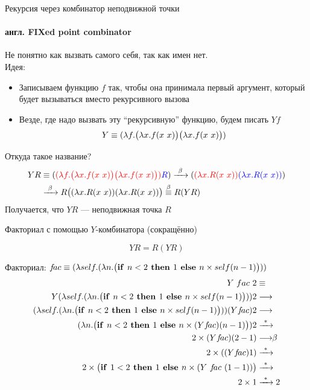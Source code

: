 \newcommand\Y{\ensuremath{Y}}
\begin{frame}{Рекурсия через комбинатор неподвижной точки}
\framesubtitle{англ. FIXed point combinator}
\def\Yimpl{\ensuremath{\lam{f}{\Lam{x}{f(x\ x)}\Lam{x}{f(x\ x)}}}}
Не понятно как вызвать самого себя, так как имен нет.\\

Идея:
\begin{itemize}
  \item Записываем функцию $f$ так, чтобы она принимала первый аргумент, который будет вызываться вместо рекурсивного вызова
  \item Везде, где надо вызвать эту \enquote{рекурсивную} функцию, будем писать $Yf$
\vspace{-0.5em}
  {\Large\begin{align*}
     Y\equiv \Yimpl
  \end{align*}}
\end{itemize}

Откуда такое название?
\begin{align*}
YR &\equiv     \redex{\Yimpl}{R} \arrbeta \redex{\lam{x}{R(x\ x)}}{\lam{x}{R(x\ x)}} \\
&\arrbeta  R\big( \lam{x}{R(x\ x)}\lam{x}{R(x\ x)} \big)   \overset{\beta}{\equiv} R(YR)
\end{align*}
Получается, что $YR$ --- неподвижная точка $R$
\end{frame}


\newcommand{\ite}[3]{\ensuremath{\big{(}\text{\textbf{if }} #1\text{\textbf{ then }}#2\text{\textbf{ else }}#3}\big{)}}
\newcommand{\FIX}{\texttt{FIX}}
\newcommand{\self}{\ensuremath{self}}

\begin{frame}{Факториал с помощью $Y$-комбинатора (сокращённо)}
\def\Yfac{\ensuremath{\app{\Y}{f\!ac}}}
\vspace{-1.6em}

\newcommand{\FAC}{\ensuremath{\lam{\self}{\lam{n}{ \ite{n<2}{1}{n \times \self(n-1)}}}}}
\[
\Y R = R (\Y R)
\]


Факториал: $f\!ac \equiv \FAC$\\

\begin{align*}
  \Y\ fac\ 2 & \equiv \\
  \Y \FAC 2 & \longrightarrow\\
  \FAC \Yfac 2 & \longrightarrow\\
  (\lambda n . \ite{n<2}{1}{n \times \Yfac (n-1)}) 2 & \arrmany \\
  2 \times \Yfac (2-1) & \betaarr \\
  2 \times (\Yfac 1) & \arrmany \\
  2 \times \ite{1<2}{1}{n \times (\Y\ f\!ac\ (1-1))} & \arrmany \\
  2 \times 1 & \arrmany 2
\end{align*}
 \end{frame}


